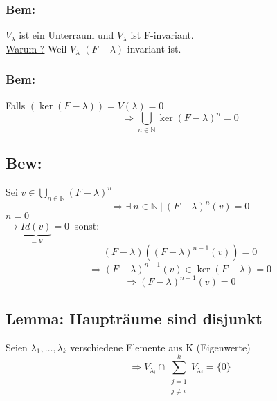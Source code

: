 \documentclass[titlepage,12pt,a4paper,ngerman]{report}
\newcommand{\ub}[1]{\underbrace{#1}}
\begin{document}
\subsubsection{Bem:}
$V_\lambda$ ist ein Unterraum und $V_\lambda$ ist F-invariant.\\
\underline{Warum ?} Weil $V_\lambda$ $(F-\lambda)$-invariant ist.
\subsubsection{Bem:}Falls $(\ker(F-\lambda))= V(\lambda) = 0$
$$\Rightarrow \bigcup_{n\in \mathbb{N}} \ker(F-\lambda)^n = 0$$
\subsection{Bew:}
Sei $v \in \bigcup_{n \in \mathbb{N}}(F-\lambda)^n$
$$\Rightarrow \exists \ n \in \mathbb{N} \ | \ (F-\lambda)^n(v) = 0$$
$n=0$\\
$\rightarrow \ub{Id(v)}_{=V} = 0\ $ sonst: $$(F-\lambda)((F-\lambda)^{n-1}(v)) = 0$$
$$\Rightarrow (F-\lambda)^{n-1}(v) \in \ker(F-\lambda) = 0$$
$$\Rightarrow (F-\lambda)^{n-1}(v) = 0$$
\subsection{Lemma: Haupträume sind disjunkt}
Seien $\lambda_1,\dots, \lambda_k$ verschiedene Elemente aus K (Eigenwerte)
$$\Rightarrow V_{\lambda_i} \cap \sum^k_{\substack{ j=1 \\ j \neq i}} V_{\lambda_j} = \{0\}$$
\end{document}
